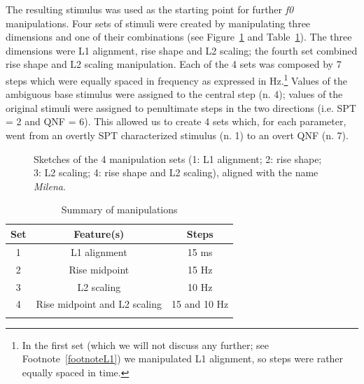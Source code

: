 The resulting stimulus was used as the starting point for further \textit{f0} manipulations. Four sets of stimuli were created by manipulating three dimensions and one of their combinations (see Figure~\ref{fig304} and Table~\ref{tab31}). The three dimensions were L1 alignment, rise shape and L2 scaling; the fourth set combined rise shape and L2 scaling manipulation. Each of the 4 sets was composed by 7 steps which were equally spaced in frequency as expressed in Hz.\footnote{In the first set (which we will not discuss any further; see Footnote~\ref{footnoteL1}) we manipulated L1 alignment, so steps were rather equally spaced in time.} Values of the ambiguous base stimulus were assigned to the central step (n. 4); values of the original stimuli were assigned to penultimate steps in the two directions (i.e. SPT = 2 and QNF = 6). This allowed us to create 4 sets which, for each parameter, went from an overtly SPT characterized stimulus (n. 1) to an overt QNF (n. 7). 

\begin{figure}
\centering
{}
\caption{Sketches of the 4 manipulation sets (1: L1 alignment; 2: rise shape; 3: L2 scaling; 4: rise shape and L2 scaling), aligned with the name \textit{Milena}.}
\label{fig304}\end{figure}

\begin{table}[h]
\centering
\begin{tabular}{c c c}
\mytoprule
Set & Feature(s) & Steps \\
\midrule
1 & L1 alignment & 15 ms \\
2 & Rise midpoint & 15 Hz \\
3 & L2 scaling & 10 Hz \\
4 & Rise midpoint and L2 scaling & 15 and 10 Hz \\
\mybottomrule
\end{tabular}
\caption{Summary of manipulations}
\label{tab31}\end{table}

